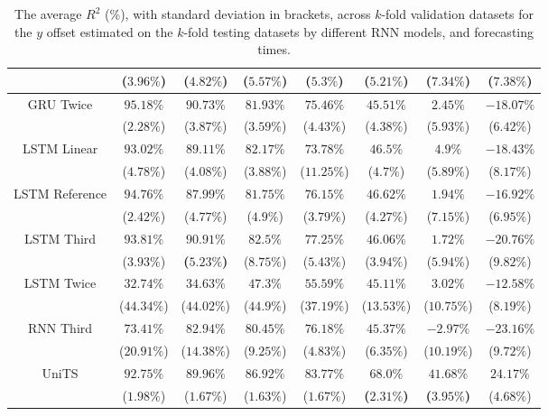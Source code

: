 \begin{table}[!ht]
{\begin{tabular}{|c|c|c|c|c|c|c|c|}
			 & ($3.96\%$) & ($4.82\%$) & ($5.57\%$) & ($5.3\%$) & ($5.21\%$) & ($7.34\%$) & ($7.38\%$) \\ \hline
			\multirow{2}{*}{GRU Twice} & $95.18\%$ & $90.73\%$ & $81.93\%$ & $75.46\%$ & $45.51\%$ & $2.45\%$ & $-18.07\%$ \\
			 & ($2.28\%$) & ($3.87\%$) & ($3.59\%$) & ($4.43\%$) & ($4.38\%$) & ($5.93\%$) & ($6.42\%$) \\ \hline
			\multirow{2}{*}{LSTM Linear} & $93.02\%$ & $89.11\%$ & $82.17\%$ & $73.78\%$ & $46.5\%$ & $4.9\%$ & $-18.43\%$ \\
			 & ($4.78\%$) & ($4.08\%$) & ($3.88\%$) & ($11.25\%$) & ($4.7\%$) & ($5.89\%$) & ($8.17\%$) \\ \hline
			\multirow{2}{*}{LSTM Reference} & $94.76\%$ & $87.99\%$ & $81.75\%$ & $76.15\%$ & $46.62\%$ & $1.94\%$ & $-16.92\%$ \\
			 & ($2.42\%$) & ($4.77\%$) & ($4.9\%$) & ($3.79\%$) & ($4.27\%$) & ($7.15\%$) & ($6.95\%$) \\ \hline
			\multirow{2}{*}{LSTM Third} & $93.81\%$ & $\mathbf{90.91\%}$ & $82.5\%$ & $77.25\%$ & $46.06\%$ & $1.72\%$ & $-20.76\%$ \\
			 & ($3.93\%$) & \textbf{(}$\mathbf{5.23\%}$\textbf{)} & ($8.75\%$) & ($5.43\%$) & ($3.94\%$) & ($5.94\%$) & ($9.82\%$) \\ \hline
			\multirow{2}{*}{LSTM Twice} & $32.74\%$ & $34.63\%$ & $47.3\%$ & $55.59\%$ & $45.11\%$ & $3.02\%$ & $-12.58\%$ \\
			 & ($44.34\%$) & ($44.02\%$) & ($44.9\%$) & ($37.19\%$) & ($13.53\%$) & ($10.75\%$) & ($8.19\%$) \\ \hline
			\multirow{2}{*}{RNN Third} & $73.41\%$ & $82.94\%$ & $80.45\%$ & $76.18\%$ & $45.37\%$ & $-2.97\%$ & $-23.16\%$ \\
			 & ($20.91\%$) & ($14.38\%$) & ($9.25\%$) & ($4.83\%$) & ($6.35\%$) & ($10.19\%$) & ($9.72\%$) \\ \hline
			\multirow{2}{*}{UniTS} & $92.75\%$ & $89.96\%$ & $86.92\%$ & $83.77\%$ & $\mathbf{68.0\%}$ & $\mathbf{41.68\%}$ & $24.17\%$ \\
			 & ($1.98\%$) & ($1.67\%$) & ($1.63\%$) & ($1.67\%$) & \textbf{(}$\mathbf{2.31\%}$\textbf{)} & \textbf{(}$\mathbf{3.95\%}$\textbf{)} & ($4.68\%$) \\ \hline
		\end{tabular}
	}
	\caption{The average $R^{2}$ (\%), with standard deviation in brackets, across $k$-fold validation datasets for the $y$ offset estimated on the $k$-fold testing datasets by different RNN models, and forecasting times.}
	\label{tab:mann_whitney_latitude_no_abs_R2}
\end{table}